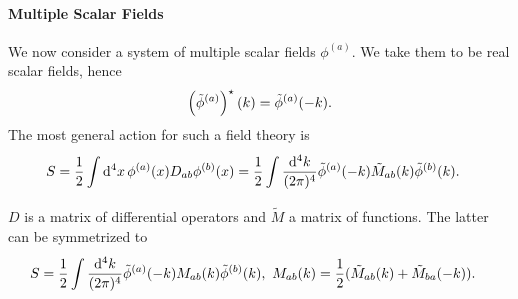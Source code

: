 \paragraph{Multiple Scalar Fields}
We now consider a system of multiple scalar fields $\phi^{(a)}$. We take them to be real scalar fields, hence
\begin{align*}
	\left(\tilde{\phi}^{(a)}\right)^{\star}(k) = \tilde{\phi}^{(a)}(-k).
\end{align*}
The most general action for such a field theory is
\begin{align*}
	S &= \frac{1}{2}\int\limits_{}^{}\dd[4]{x}\phi^{(a)}(x)D_{ab}\phi^{(b)}(x) = \frac{1}{2}\int\limits_{}^{}\frac{\dd[4]{k}}{(2\pi)^{4}}\tilde{\phi}^{(a)}(-k)\tilde{M}_{ab}(k)\tilde{\phi}^{(b)}(k).
\end{align*}
$D$ is a matrix of differential operators and $\tilde{M}$ a matrix of functions. The latter can be symmetrized to
\begin{align*}
	S &= \frac{1}{2}\inte{}{}\frac{\dd[4]{k}}{(2\pi)^{4}}\tilde{\phi}^{(a)}(-k)M_{ab}(k)\tilde{\phi}^{(b)}(k),\ M_{ab}(k) = \frac{1}{2}(\tilde{M}_{ab}(k) + \tilde{M}_{ba}(-k)).
\end{align*}

